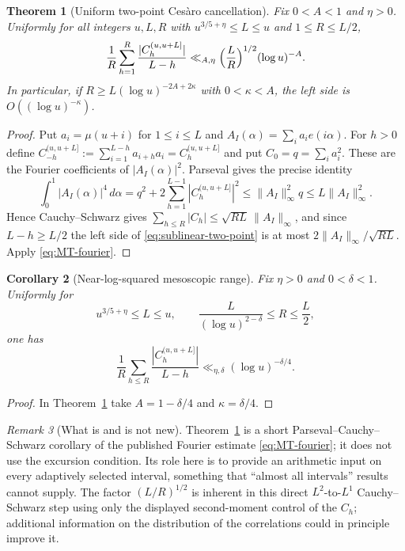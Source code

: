 \documentclass[11pt]{amsart}
\numberwithin{equation}{section}
\theoremstyle{plain}
\newtheorem{theorem}{Theorem}[section]
\newtheorem{corollary}[theorem]{Corollary}
\theoremstyle{definition}
\theoremstyle{remark}
\newtheorem{remark}[theorem]{Remark}
\begin{document}
\begin{theorem}[Uniform two-point Ces\`aro cancellation]
\label{thm:sublinear-two-point}
Fix $0<A<1$ and $\eta>0$. Uniformly for all integers $u,L,R$ with
$u^{3/5+\eta}\le L\le u$ and $1\le R\le L/2$,
\begin{equation}
\label{eq:sublinear-two-point}
\frac1R\sum_{h=1}^{R}\frac{|C^{(u,u+L]}_h|}{L-h}
\ll_{A,\eta}\Bigl(\frac LR\Bigr)^{1/2}(\log u)^{-A}.
\end{equation}
In particular, if $R\ge L(\log u)^{-2A+2\kappa}$ with
$0<\kappa<A$, the left side is $O((\log u)^{-\kappa})$.
\end{theorem}

\begin{proof}
Put $a_i=\mu(u+i)$ for $1\le i\le L$ and
$A_I(\alpha)=\sum_ia_ie(i\alpha)$. For $h>0$ define
$C_{-h}^{(u,u+L]}:=\sum_{i=1}^{L-h}a_{i+h}a_i=C_h^{(u,u+L]}$ and put
$C_0=q=\sum_i a_i^2$.  These are the Fourier coefficients of
$|A_I(\alpha)|^2$.  Parseval gives the precise identity
\[
\int_0^1|A_I(\alpha)|^4\,d\alpha
=q^2+2\sum_{h=1}^{L-1}|C_h^{(u,u+L]}|^2
\le\|A_I\|_\infty^2q
\le L\|A_I\|_\infty^2.
\]
Hence Cauchy--Schwarz gives
$\sum_{h\le R}|C_h|\le\sqrt{RL}\,\|A_I\|_\infty$, and since
$L-h\ge L/2$ the left side of \eqref{eq:sublinear-two-point} is at most
$2\|A_I\|_\infty/\sqrt{RL}$. Apply \eqref{eq:MT-fourier}.
\end{proof}

\begin{corollary}[Near-log-squared mesoscopic range]
\label{cor:near-log2-lags}
Fix $\eta>0$ and $0<\delta<1$. Uniformly for
\[
u^{3/5+\eta}\le L\le u,
\qquad
\frac{L}{(\log u)^{2-\delta}}\le R\le\frac L2,
\]
one has
\[
\frac1R\sum_{h\le R}\frac{|C^{(u,u+L]}_h|}{L-h}
\ll_{\eta,\delta}(\log u)^{-\delta/4}.
\]
\end{corollary}

\begin{proof}
In Theorem~\ref{thm:sublinear-two-point} take
$A=1-\delta/4$ and $\kappa=\delta/4$.
\end{proof}

\begin{remark}[What is and is not new]
\label{rem:sublinear-status}
Theorem~\ref{thm:sublinear-two-point} is a short Parseval--Cauchy--Schwarz
corollary of the published Fourier estimate \eqref{eq:MT-fourier}; it does
not use the excursion condition. Its role here is to provide an arithmetic
input on every adaptively selected interval, something that ``almost all
intervals'' results cannot supply. The factor $(L/R)^{1/2}$ is inherent in
this direct $L^2$-to-$L^1$ Cauchy--Schwarz step using only the displayed
second-moment control of the $C_h$; additional information on the
distribution of the correlations could in principle improve it.
\end{remark}
\end{document}
